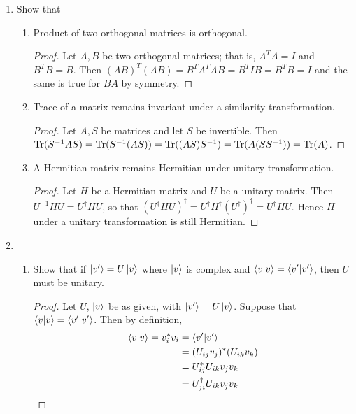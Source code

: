 \documentclass[11pt]{article}
\begin{document}
\begin{enumerate}[label=14.\arabic*]
    \item Show that \begin{enumerate}[label=(\alph*)]
        \item Product of two orthogonal matrices is orthogonal.
        \begin{proof}
            Let $A,B$ be two orthogonal matrices; that is, $A^TA = I$ and $B^TB = B$. Then $(AB)^T(AB) = B^TA^TAB = B^TIB = B^TB = I$ and the same is true for $BA$ by symmetry.
        \end{proof}
        \item Trace of a matrix remains invariant under a similarity transformation.
        \begin{proof}
            Let $A,S$ be matrices and let $S$ be invertible. Then $\Trace(S^{-1}AS) = \Trace(S^{-1}(AS)) = \Trace((AS)S^{-1}) = \Trace(A(SS^{-1})) = \Trace(A)$.
        \end{proof}
        \item A Hermitian matrix remains Hermitian under unitary transformation.
        \begin{proof}
            Let $H$ be a Hermitian matrix and $U$ be a unitary matrix. Then $U^{-1}HU = U^{\dagger}HU$, so that $(U^{\dagger}HU)^{\dagger} = U^{\dagger}H^{\dagger}(U^{\dagger})^{\dagger} = U^{\dagger}HU$. Hence $H$ under a unitary transformation is still Hermitian.
        \end{proof}
    \end{enumerate}
    \item \begin{enumerate}[label=(\alph*)]
        \item Show that if $\ket{v^{\prime}} = U\ket{v}$ where $\ket{v}$ is complex and $\bra{v}\ket{v} = \bra{v^{\prime}}\ket{v^{\prime}}$, then $U$ must be unitary.
        \begin{proof}
            Let $U$, $\ket{v}$ be as given, with $\ket{v^{\prime}} = U\ket{v}$. Suppose that $\bra{v}\ket{v} = \bra{v^{\prime}}\ket{v^{\prime}}$. Then by definition,
            \begin{align*}
                \bra{v}\ket{v} = v_i^{\ast}v_i &= \bra{v^{\prime}}\ket{v^{\prime}}\\
                &= (U_{ij}v_j)^{\ast}(U_{ik}v_k)\\
                &= U_{ij}^{\ast}U_{ik} v_jv_k\\
                &= U^{\dagger}_{ji}U_{ik} v_jv_k\\

\end{align*}
\end{proof}
\end{enumerate}
\end{enumerate}
\end{document}

